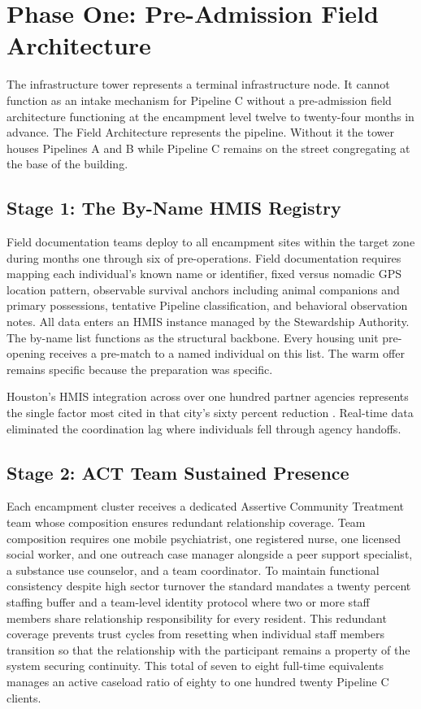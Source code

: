 \documentclass[12pt, letterpaper]{article}
\begin{document}
\clearpage
\section{Phase One: Pre-Admission Field Architecture}

The infrastructure tower represents a terminal infrastructure node. It cannot function as an intake mechanism for Pipeline C without a pre-admission field architecture functioning at the encampment level twelve to twenty-four months in advance. The Field Architecture represents the pipeline. Without it the tower houses Pipelines A and B while Pipeline C remains on the street congregating at the base of the building.

\subsection{Stage 1: The By-Name HMIS Registry}

Field documentation teams deploy to all encampment sites within the target zone during months one through six of pre-operations. Field documentation requires mapping each individual's known name or identifier, fixed versus nomadic GPS location pattern, observable survival anchors including animal companions and primary possessions, tentative Pipeline classification, and behavioral observation notes. All data enters an HMIS instance managed by the Stewardship Authority. The by-name list functions as the structural backbone. Every housing unit pre-opening receives a pre-match to a named individual on this list. The warm offer remains specific because the preparation was specific.

Houston's HMIS integration across over one hundred partner agencies represents the single factor most cited in that city's sixty percent reduction \citep{houston_way_home_2024}. Real-time data eliminated the coordination lag where individuals fell through agency handoffs.

\subsection{Stage 2: ACT Team Sustained Presence}

Each encampment cluster receives a dedicated Assertive Community Treatment team whose composition ensures redundant relationship coverage. Team composition requires one mobile psychiatrist, one registered nurse, one licensed social worker, and one outreach case manager alongside a peer support specialist, a substance use counselor, and a team coordinator. To maintain functional consistency despite high sector turnover the standard mandates a twenty percent staffing buffer and a team-level identity protocol where two or more staff members share relationship responsibility for every resident. This redundant coverage prevents trust cycles from resetting when individual staff members transition so that the relationship with the participant remains a property of the system securing continuity. This total of seven to eight full-time equivalents manages an active caseload ratio of eighty to one hundred twenty Pipeline C clients.
\end{document}
